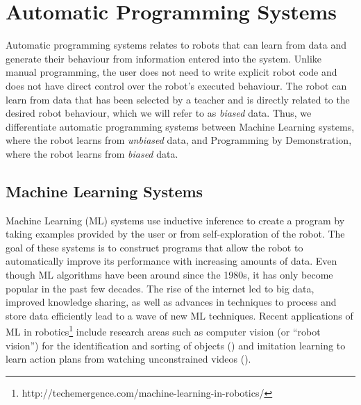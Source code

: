 \section{Automatic Programming Systems}\label{subsec:Automatic Programming Systems}
Automatic programming systems relates to robots that can learn from data and generate their behaviour from information entered into the system.
Unlike manual programming, the user does not need to write explicit robot code and does not have direct control over the robot's executed behaviour.
The robot can learn from data that has been selected by a teacher and is directly related to the desired robot behaviour, which we will refer to as \textit{biased} data.
Thus, we differentiate automatic programming systems between Machine Learning systems, where the robot learns from \textit{unbiased} data, and Programming by Demonstration, where the robot learns from \textit{biased} data.

\subsection{Machine Learning Systems}\label{sssec:Learning Systems}
Machine Learning (ML) systems use inductive inference to create a program by taking examples provided by the user or from self-exploration of the robot. 
The goal of these systems is to construct programs that allow the robot to automatically improve its performance with increasing amounts of data. 
Even though ML algorithms have been around since the 1980s, it has only become popular in the past few decades. 
The rise of the internet led to big data, improved knowledge sharing, as well as advances in techniques to process and store data efficiently lead to a wave of new ML techniques.
Recent applications of ML in robotics\footnote{http://techemergence.com/machine-learning-in-robotics/} include research areas such as computer vision (or ``robot vision'') for the identification and sorting of objects (\cite{stager2013computer}) and imitation learning to learn action plans from watching unconstrained videos (\cite{Yang2015}).

